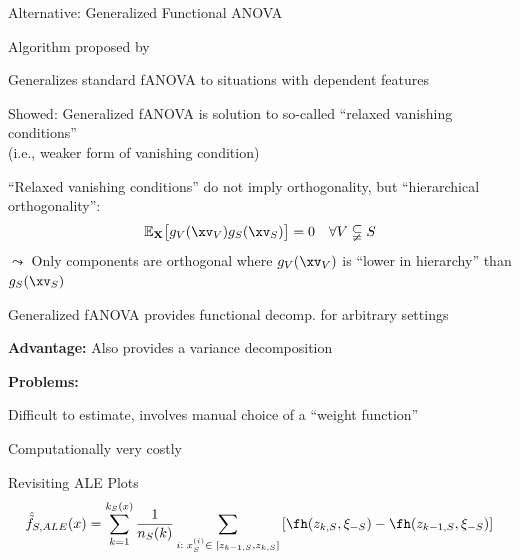 \documentclass[10pt,compress,t,notes=noshow, xcolor=table]{beamer}
\newcommand{\Xv}{\mathbf{X}} %
\begin{document}
\begin{framei}[align=top]{Alternative: Generalized Functional ANOVA}
\item Algorithm proposed by 
\item Generalizes standard fANOVA to situations with dependent features
\pause
\item Showed: Generalized fANOVA is solution to so-called ``relaxed vanishing conditions'' \\
(i.e., weaker form of vanishing condition) \\
\item ``Relaxed vanishing conditions'' do not imply orthogonality, but ``hierarchical orthogonality'':
$$
\mathbb{E}_{\Xv} \bigl[ g_{V}(\xv_V) g_{S}(\xv_S) \bigr] = 0 \quad \forall V \subsetneqq S
$$
\pause
$\leadsto$ Only components are orthogonal where $g_{V}(\xv_V)$ is ``lower in hierarchy'' than $g_{S}(\xv_S)$
\item[$\implies$] Generalized fANOVA provides functional decomp. for arbitrary settings
\item \textbf{Advantage:} Also provides a variance decomposition
\pause
\item \textbf{Problems:}
\item Difficult to estimate, involves manual choice of a ``weight function''
\item Computationally very costly
\end{framei}


    

\begin{framev}[align=top]{Revisiting ALE Plots}
$$
\hat{\tilde{f}}_{S, ALE}(x) = \sum_{k = 1}^{k_S(x)}\frac{1}{n_S(k)}\sum_{i: \; x_S^{(i)} \in \; [z_{k-1, S}, z_{k, S}]}\left[\fh(z_{k, S}, \xi_{-S}) -\fh(z_{k-1, S}, \xi_{-S})\right]
$$
\end{framev}
\end{document}
